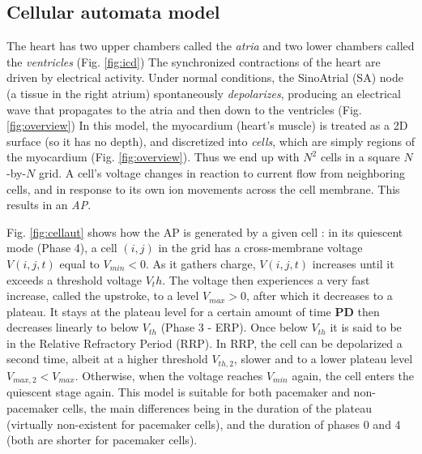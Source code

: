 \subsection{Cellular automata model}
The heart has two upper chambers called the \emph{atria} and two lower chambers called the \emph{ventricles} (Fig. \ref{fig:icd})
The synchronized contractions of the heart are driven by electrical activity.
Under normal conditions, the SinoAtrial (SA) node (a tissue in the right atrium) spontaneously \emph{depolarizes}, producing an electrical wave that propagates to the atria and then down to the ventricles (Fig.\ref{fig:overview})
In this model, the myocardium (heart's muscle) is treated as a 2D surface (so it has no depth), and discretized into \emph{cells}, which are simply regions of the myocardium (Fig. \ref{fig:overview}). 
Thus we end up with $N^2$ cells in a square $N$-by-$N$ grid.
A cell's voltage changes in reaction to current flow from neighboring cells, and in response to its own ion movements across the cell membrane.
This results in an \emph{\ac{AP}}.

Fig. \ref{fig:cellaut} shows how the \ac{AP} is generated by a given cell \cite{Klabunde_CVEPconcepts}:
in its quiescent mode (Phase 4), a cell $(i,j)$ in the grid has a cross-membrane voltage $V(i,j,t)$ equal to $V_{min} < 0$.
As it gathers charge, $V(i,j,t)$  increases until it exceeds a threshold voltage $V_th$.
The voltage then experiences a very fast increase, called the upstroke, to a level $V_{max} > 0$, after which it decreases to a plateau.
It stays at the plateau level for a certain amount of time \textbf{PD}  then decreases linearly to below $V_{th}$ (Phase 3 - ERP).
Once below $V_{th}$ it is said to be in the Relative Refractory Period (RRP).
In RRP, the cell can be depolarized a second time, albeit at a higher threshold $V_{th,2}$, slower and to a lower plateau level $V_{max,2} < V_{max}$.
Otherwise, when the voltage reaches $V_{min}$ again, the cell enters the quiescent stage again. 
This model is suitable for both pacemaker and non-pacemaker cells, the main differences being in the duration of the plateau (virtually non-existent for pacemaker cells), and the duration of phases 0 and 4 (both are shorter for pacemaker cells).

